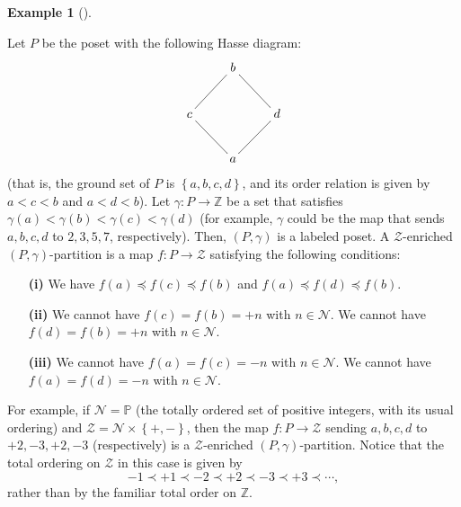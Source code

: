\documentclass[numbers=enddot,12pt,final,onecolumn,notitlepage]{scrartcl}%
\makeatletter
\theoremstyle{definition}
\newtheorem{exmp}[theo]{Example}
\newenvironment{example}[1][]
{\begin{exmp}[#1]\begin{leftbar}}
{\end{leftbar}\end{exmp}}
\newcommand{\are}{\ar@{-}}
\makeatother
\begin{document}
\Needspace{4cm}

\begin{example}
\label{exa.ambivPp.diamond}Let $P$ be the poset with the following Hasse
diagram:%
\[%
\xymatrix{
& b \are[dl] \are[dr] \\
c \are[dr] & & d \are[dl] \\
& a
}%
\]
(that is, the ground set of $P$ is $\left\{ a, b, c, d \right\}$, and
its order relation is given by $a < c < b$ and $a < d < b$).
Let $\gamma:P\rightarrow\mathbb{Z}$ be a set that satisfies
$\gamma\left(  a\right)  <\gamma\left(  b\right)  <\gamma\left(  c\right)
<\gamma\left(  d\right)  $ (for example, $\gamma$ could be the map that sends
$a,b,c,d$ to $2,3,5,7$, respectively).
Then, $\left(P, \gamma\right)$ is a labeled poset.
A $\mathcal{Z}$-enriched $\left(
P,\gamma\right)  $-partition is a map $f:P\rightarrow\mathcal{Z}$ satisfying
the following conditions:

\begin{enumerate}
\item[\textbf{(i)}] We have $f\left(  a\right)  \preccurlyeq f\left(
c\right)  \preccurlyeq f\left(  b\right)  $ and $f\left(  a\right)
\preccurlyeq f\left(  d\right)  \preccurlyeq f\left(  b\right)  $.

\item[\textbf{(ii)}] We cannot have $f\left(  c\right)  =f\left(  b\right)
=+n$ with $n\in\mathcal{N}$. \newline
We cannot have $f\left(  d\right)
=f\left(  b\right)  =+n$ with $n\in\mathcal{N}$.

\item[\textbf{(iii)}] We cannot have $f\left(  a\right)  =f\left(  c\right)
=-n$ with $n\in\mathcal{N}$. \newline
We cannot have $f\left(  a\right)
=f\left(  d\right)  =-n$ with $n\in\mathcal{N}$.
\end{enumerate}

For example, if $\mathcal{N}=\mathbb{P}$ (the totally ordered set of positive
integers, with its usual ordering) and $\mathcal{Z}=\mathcal{N}\times\left\{
+,-\right\}  $, then the map $f:P\rightarrow\mathcal{Z}$ sending $a,b,c,d$ to
$+2,-3,+2,-3$ (respectively) is a $\mathcal{Z}$-enriched $\left(
P,\gamma\right)  $-partition. Notice that the total ordering on $\mathcal{Z}$
in this case is given by%
\[
-1\prec+1\prec-2\prec+2\prec-3\prec+3\prec\cdots,
\]
rather than by the familiar total order on $\mathbb{Z}$.
\end{example}
\end{document}
